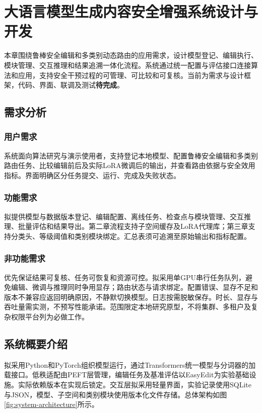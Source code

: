 \chapter{大语言模型生成内容安全增强系统设计与开发}\label{chap:system}

本章围绕鲁棒安全编辑和多类别动态路由的应用需求，设计模型登记、编辑执行、模块管理、交互推理和结果追溯一体化流程。系统通过统一配置与评估接口连接算法和应用，支持安全干预过程的可管理、可比较和可复核。当前为需求与设计框架，代码、界面、联调及测试\textbf{待完成}。

\section{需求分析}
\subsection{用户需求}

系统面向算法研究与演示使用者，支持登记本地模型、配置鲁棒安全编辑和多类别路由任务、比较编辑前后及实际LoRA微调后的输出，并查看路由依据与安全效用指标。界面明确区分任务提交、运行、完成及失败状态。

\subsection{功能需求}

拟提供模型与数据版本登记、编辑配置、离线任务、检查点与模块管理、交互推理、批量评估和结果导出。第二章流程支持子空间缓存及LoRA代理库；第三章支持分类头、等级阈值和类别模块绑定。汇总表须可追溯至原始输出和指标配置。

\subsection{非功能需求}

优先保证结果可复核、任务可恢复和资源可控。拟采用单GPU串行任务队列，避免编辑、微调与推理同时争用显存；路由状态与请求绑定。配置错误、显存不足和版本不兼容应返回明确原因，不静默切换模型。日志按需脱敏保存。时长、显存与吞吐量需实测，不预写性能承诺。范围限定本地研究原型，不将集群、多租户及复杂权限平台列为必做工作。

\section{系统概要介绍}

拟采用Python和PyTorch组织模型运行，通过Transformers统一模型与分词器的加载接口\cite{wolf2020transformers}。低秩适配由PEFT层管理，编辑任务及基准评估以EasyEdit为实验基础设施\cite{hu2022lora,wang2024easyedit}。实际依赖版本在实现后锁定。交互层拟采用轻量界面，实验记录使用SQLite与JSON，模型、子空间和类别模块使用版本化文件存储。总体架构如图\ref{fig:system-architecture}所示。

